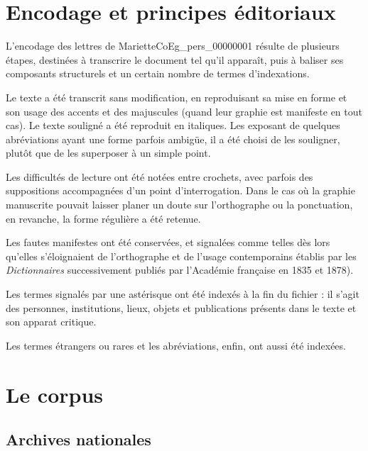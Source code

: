 \documentclass{book}
\begin{document}
\section*{Encodage et principes éditoriaux}
L'encodage des lettres de Mariette\gls{CoEg_pers_00000001} résulte de plusieurs étapes, destinées à transcrire le document tel qu'il apparaît, puis à baliser ses composants structurels et un certain nombre de termes d'indexations.
\par Le texte a été transcrit sans modification, en reproduisant sa mise en forme et son usage des accents et des majuscules (quand leur graphie est manifeste en tout cas). Le texte souligné a été reproduit en italiques. Les exposant de quelques abréviations ayant une forme parfois ambigüe, il a été choisi de les souligner, plutôt que de les superposer à un simple point.
\par Les difficultés de lecture ont été notées entre crochets, avec parfois des suppositions accompagnées d'un point d'interrogation. Dans le cas où la graphie manuscrite pouvait laisser planer un doute sur l'orthographe ou la ponctuation, en revanche, la forme régulière a été retenue.
\par Les fautes manifestes ont été conservées, et signalées comme telles dès lors qu'elles s'éloignaient de l'orthographe et de l'usage contemporains établis par les \emph{Dictionnaires} successivement publiés par l'Académie française en 1835 et 1878).
\par Les termes signalés par une astérisque ont été indexés à la fin du fichier : il s'agit des personnes, institutions, lieux, objets et publications présents dans le texte et son apparat critique.
\par Les termes étrangers ou rares et les abréviations, enfin, ont aussi été indexées.
\section*{Le corpus}
\subsection*{Archives nationales}
\end{document}
